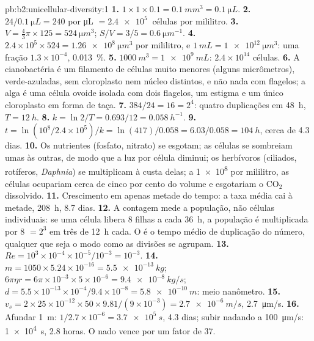 \begin{solution}{pb:b2:unicellular-diversity:1}
\textbf{1.} $1\times 1\times 0.1 = \qty{0.1}{mm^3} = \qty{0.1}{\micro L}$.
\textbf{2.} $24/\qty{0.1}{\micro L} = 240$ por \unit{\micro L} $=
\qty{2.4e5}{}$ células por mililitro.
\textbf{3.} $V = \tfrac{4}{3}\pi\times 125 = \qty{524}{\micro m^3}$;
$S/V = 3/5 = \qty{0.6}{\micro m^{-1}}$.
\textbf{4.} $2.4\times 10^5\times 524 = \qty{1.26e8}{\micro m^3}$ por
mililitro, e $\qty{1}{mL} = \qty{1e12}{\micro m^3}$: uma fração
$1.3\times 10^{-4}$, \qty{0.013}{\%}.
\textbf{5.} $\qty{1000}{m^3} = \qty{1e9}{mL}$: $2.4\times 10^{14}$
células.
\textbf{6.} A cianobactéria é um filamento de células muito menores
(alguns micrômetros), verde-azuladas, sem cloroplasto nem núcleo
distintos, e não nada com flagelos; a alga é uma célula ovoide isolada
com dois flagelos, um estigma e um único cloroplasto em forma de taça.
\textbf{7.} $384/24 = 16 = 2^4$: quatro duplicações em \qty{48}{h},
$T = \qty{12}{h}$.
\textbf{8.} $k = \ln 2/T = 0.693/12 = \qty{0.058}{h^{-1}}$.
\textbf{9.} $t = \ln(10^8/2.4\times 10^5)/k = \ln(417)/0.058 =
6.03/0.058 = \qty{104}{h}$, cerca de 4.3 dias.
\textbf{10.} Os nutrientes (fosfato, nitrato) se esgotam; as células
se sombreiam umas às outras, de modo que a luz por célula diminui; os
herbívoros (ciliados, rotíferos, \emph{Daphnia}) se multiplicam à
custa delas; a \qty{1e8}{} por mililitro, as células ocupariam cerca de
cinco por cento do volume e esgotariam o $\mathrm{CO_2}$
dissolvido.
\textbf{11.} Crescimento em apenas metade do tempo: a taxa média cai à
metade, \qty{208}{h}, 8.7 dias.
\textbf{12.} A contagem mede a população, não células individuais:
se uma célula libera 8 filhas a cada \qty{36}{h}, a população é
multiplicada por 8 $= 2^3$ em três  de \qty{12}{h}
cada. O  é o tempo médio de duplicação do número,
qualquer que seja o modo como as divisões se agrupam.
\textbf{13.} $Re = 10^3\times 10^{-4}\times 10^{-5}/10^{-3} = 10^{-3}$.
\textbf{14.} $m = 1050\times 5.24\times 10^{-16} = \qty{5.5e-13}{kg}$;
$6\pi\eta r = 6\pi\times 10^{-3}\times 5\times 10^{-6} =
\qty{9.4e-8}{kg/s}$; $d = 5.5\times 10^{-13}\times 10^{-4}/9.4\times
10^{-8} = \qty{5.8e-10}{m}$: meio nanômetro.
\textbf{15.} $v_s = 2\times 25\times 10^{-12}\times 50\times
9.81/(9\times 10^{-3}) = \qty{2.7e-6}{m/s}$, \qty{2.7}{\micro m/s}.
\textbf{16.} Afundar \qty{1}{m}: $1/2.7\times 10^{-6} =
\qty{3.7e5}{s}$, 4.3 dias; subir nadando a \qty{100}{\micro m/s}:
\qty{1e4}{s}, 2.8 horas. O nado vence por um fator de 37.

\end{solution}
